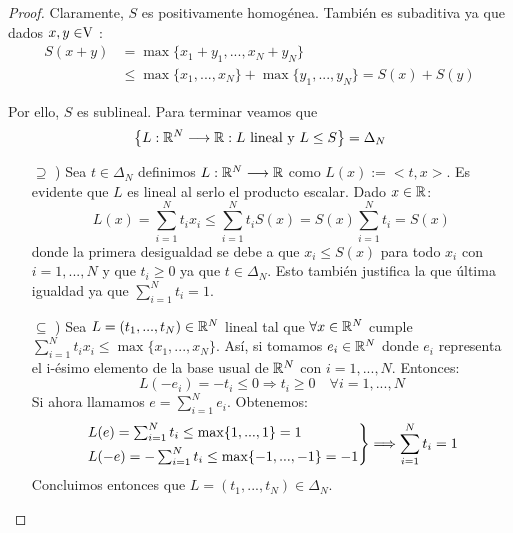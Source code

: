 	\begin{proof}
		Claramente, $ S $ es positivamente homogénea. También es subaditiva ya que dados $ x,y \in \vecSpace $ : 
		\begin{equation*}
		\begin{split}
		S(x+y) &= \max \{x_1 + y_1, ..., x_N +y_N \}\\ 
		&\leq \max\{x_1, ..., x_N\} + \max \{y_1, ...,y_N\} = S(x) + S(y)
		\end{split}
		\end{equation*}
		
		Por ello, $ S $ es sublineal. Para terminar veamos que 
		\begin{equation*}
			\left\lbrace L:\mathbb{R}^N \longrightarrow \mathbb{R} : L \text{ lineal y }L\leq S \right\rbrace = \Delta_N
		\end{equation*}
		
		\begin{itemize}
			\item[$ \supseteq $ )] Sea $ t \in \Delta_N$ definimos $ L:\mathbb{R}^N \longrightarrow \mathbb{R} $ como $ L(x):= <t,x> $. Es evidente que $ L $ es lineal al serlo el producto escalar. Dado $ x \in \mathbb{R} $:
			\begin{equation*}
				L(x) = \sum_{i=1}^{N}{t_i x_i} \leq \sum_{i=1}^{N}{t_i S(x)} = S(x)\sum_{i=1}^{N}{t_i} = S(x)
			\end{equation*}
			donde la primera desigualdad se debe a que $ x_i \leq S(x)$ para todo $ x_i$ con $ i=1,...,N $ y que $ t_i \geq 0 $ ya que $ t \in \Delta_N$. Esto también justifica la que última igualdad ya que $ \sum_{i=1}^{N}{t_i} = 1 $.
			
			\item[$ \subseteq $ )] Sea $ L =  (t_1,...,t_N) \in \mathbb{R}^N $ lineal tal que $ \forall x \in \mathbb{R}^N $ cumple $ \sum_{i=1}^{N}{t_i x_i} \leq \max\{x_1,...,x_N\}$. Así, si tomamos $ e_i \in \mathbb{R}^N $ donde $ e_i $ representa el i-ésimo elemento de la base usual de $ \mathbb{R}^N $ con $ i=1,...,N $. Entonces:   		
			\begin{equation*}
				L(-e_i) = -t_i \leq 0 \Longrightarrow t_i \geq 0 \quad \forall i=1,...,N
			\end{equation*}
			Si ahora llamamos $ e = \sum_{i=1}^{N}{e_i} $. Obtenemos:
			\begin{equation*}
				\begin{rcases*}
				L(e) = \sum_{i=1}^{N}{t_i} \leq \max \{1, ...,1\} = 1 \\
				L(-e) = -\sum_{i=1}^{N}{t_i} \leq \max \{-1, ...,-1\} = -1
				\end{rcases*} \Longrightarrow \sum_{i=1}^{N}{t_i} = 1
			\end{equation*}
			Concluimos entonces que $ L =  (t_1,...,t_N) \in \Delta_N $.
		\end{itemize}
		
	\end{proof}

